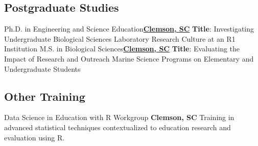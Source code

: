 \subsection{Postgraduate Studies}
\begin{cvtable}
        {\color{cvsectioncolor}Ph.D. in Engineering and Science Education}{\href{https://www.clemson.edu/cecas/departments/ese/index.html}
        {\textbf{Clemson, SC}}}
        {\textbf{Title}: Investigating Undergraduate Biological Sciences Laboratory Research Culture at an R1 Institution
            }
        {\color{cvsectioncolor}M.S. in Biological Sciences}{\href{https://www.clemson.edu/science/academics/departments/biosci/}
        {\textbf{Clemson, SC}}}
        {\textbf{Title}: Evaluating the Impact of Research and Outreach Marine Science Programs on Elementary and Undergraduate Students
            }
\end{cvtable}


\subsection{Other Training}
\begin{cvtable}
        {\color{cvsectioncolor}\small Data Science in Education with R Workgroup}
        {\textbf{Clemson, SC}}
        {Training in advanced statistical techniques contextualized to education research and evaluation using R.}
	\end{cvtable}

